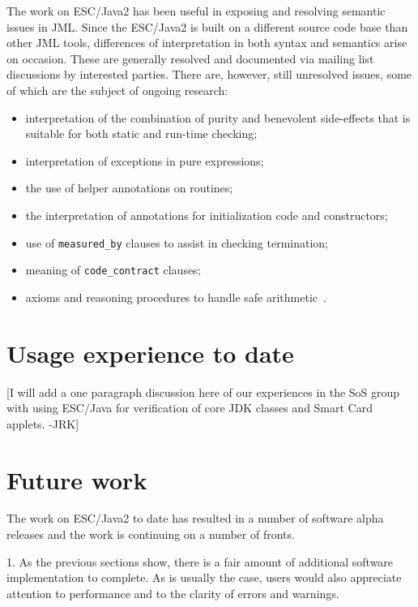 \documentclass{acm_proc_article-sp}
\begin{document}
The work on ESC/Java2 has been useful in exposing and resolving
semantic issues in JML.  Since the ESC/Java2 is built on a different
source code base than other JML tools, differences of interpretation
in both syntax and semantics arise on occasion.  These are generally
resolved and documented via mailing list discussions by interested
parties.  There are, however, still unresolved issues, some of which
are the subject of ongoing research:
\setlength{\partopsep}{0in}\setlength{\parskip}{0in}\setlength{\itemsep}{0in}\setlength{\topsep}{0in}
\begin{itemize}
\setlength{\partopsep}{0in}\setlength{\parskip}{0in}\setlength{\itemsep}{0in}\setlength{\topsep}{0in}
\item interpretation of the combination of purity and benevolent
  side-effects that is suitable for both static and run-time checking;
\item interpretation of exceptions in pure expressions;
\item the use of helper annotations on routines;
\item the interpretation of annotations for initialization code and
  constructors;
\item use of \texttt{measured\_by} clauses to assist in checking
  termination;
\item meaning of \texttt{code\_contract} clauses;
\item axioms and reasoning procedures to handle safe
  arithmetic~\cite{Chalin03}.
\end{itemize}

\section{Usage experience to date}
[I will add a one paragraph discussion here of our experiences in
the SoS group with using ESC/Java for verification of core JDK classes
and Smart Card applets. -JRK]

\section{Future work}
The work on ESC/Java2 to date has resulted in a number of software
alpha releases and the work is continuing on a number of fronts.

1. As the previous sections show, there is a fair amount of
  additional software implementation to complete.  As is usually the
  case, users would also appreciate attention to performance and to
  the clarity of errors and warnings.
\end{document}

